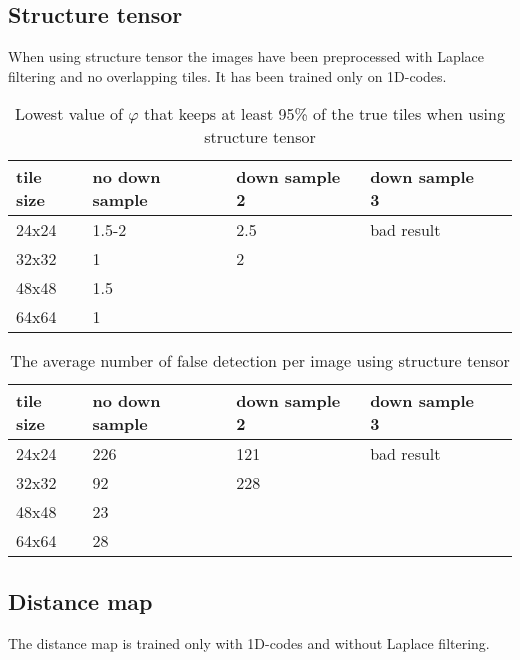 \subsection{Structure tensor}
When using structure tensor the images have been preprocessed with Laplace filtering and no overlapping tiles. It has been trained only on 1D-codes. 

\begin{table}[H]
\begin{center}
     \begin{tabular}{ | l | l | l | l | l |}
     \hline
     tile size & no down sample & down sample 2 & down sample 3 \\ \hline
   	 24x24 & 1.5-2 & 2.5 & bad result 	\\ \hline
     32x32 & 1 & 2  & 					\\ \hline
     48x48 & 1.5 &     &  				\\ \hline
     64x64 & 1 &     &					\\ \hline
     \end{tabular}
\end{center}
\caption{Lowest value of $\varphi$ that keeps at least 95\% of the true tiles when using structure tensor}
\end{table}

\begin{table}[H]
\begin{center}
     \begin{tabular}{ | l | l | l | l | l |}
     \hline
     tile size & no down sample & down sample 2 & down sample 3 \\ \hline
   	 24x24 & 226 & 121 & bad result 	\\ \hline
     32x32 & 92 & 228 & 				\\ \hline
     48x48 & 23    &     &  			\\ \hline
     64x64 & 28     &     &				\\ \hline
     \end{tabular}
\end{center}
\caption{The average number of false detection per image using structure tensor}
\end{table}

\subsection{Distance map}
The distance map is trained only with 1D-codes and without Laplace filtering.

